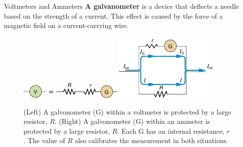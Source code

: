 \documentclass{beamer}
\begin{document}
\begin{frame}{Voltmeters and Ammeters}
\textbf{\alert{A galvanometer}} is a device that deflects a needle based on the strength of a current.  This effect is caused by the force of a magnetic field on a current-carrying wire.
\footnotesize
\begin{figure}
\centering
\includegraphics[width=0.45\textwidth]{figures/galvo_1.png} \hspace{0.5cm}
\includegraphics[width=0.45\textwidth]{figures/galvo_2.png}
\caption{\label{fig:galvo} (Left) A galvonometer (G) within a voltmeter is protected by a large resistor, $R$.  (Right) A galvonometer (G) within an ammeter is protected by a large resistor, $R$.  Each G has an internal resistance, $r$.  The value of $R$ also calibrates the measurement in both situations.}
\end{figure}
\end{frame}
\end{document}
